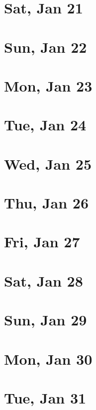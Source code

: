 	\section{Sat, Jan 21}
		
	\section{Sun, Jan 22}
		
	\section{Mon, Jan 23}
		
	\section{Tue, Jan 24}
		
	\section{Wed, Jan 25}
		
	\section{Thu, Jan 26}
		
	\section{Fri, Jan 27}
		
	\section{Sat, Jan 28}
		
	\section{Sun, Jan 29}
		
	\section{Mon, Jan 30}
		
	\section{Tue, Jan 31}
		
